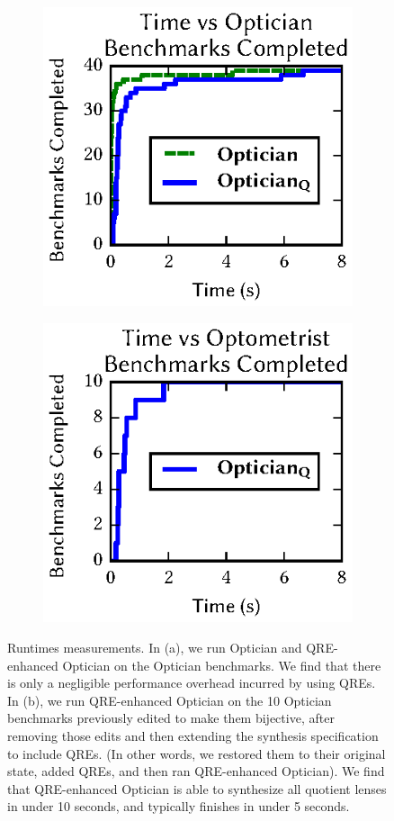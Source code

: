 \documentclass[acmsmall,screen]{acmart}
\newcommand{\QOpt}{QRE-enhanced Optician}
\begin{document}
\begin{figure}[t]
\centering
\begin{subfigure}[b]{.49\textwidth}
\centering
\includegraphics{generated-graphs/times_opt}
\caption{}
\label{subfig:lenssize}
\end{subfigure}
\begin{subfigure}[b]{.49\textwidth}
\includegraphics{generated-graphs/times_new.eps}
\caption{}
\label{subfig:examplesused}
\end{subfigure}
\caption{Runtimes measurements. In (a), we run Optician and \QOpt{}
  on the Optician benchmarks.  We find that there is only a negligible
  performance overhead incurred by using QREs. 
  In (b), we run \QOpt{} on the 10 Optician benchmarks
  previously edited to make them bijective, after removing those edits
  and then extending the synthesis specification to include QREs.
  (In other words, we restored them to their original state, added QREs,
  and then ran \QOpt{}). 
  We find that \QOpt{} is able to
  synthesize all quotient lenses in under 10 seconds, and typically finishes in
  under 5 seconds.}
\label{fig:times}
\end{figure}
\end{document}
